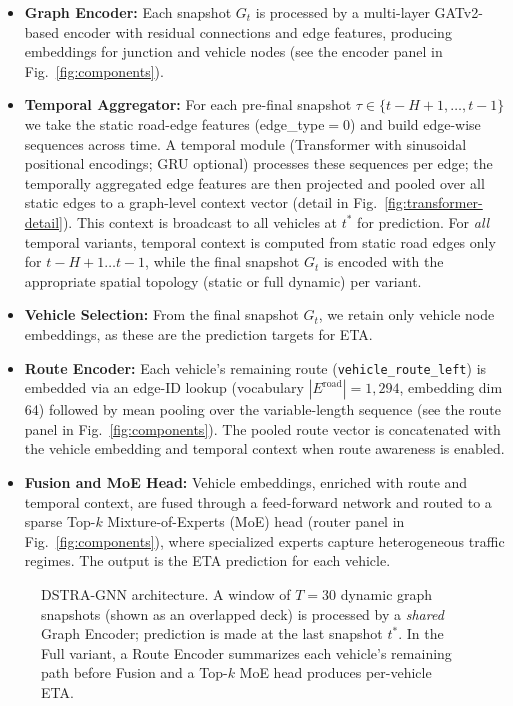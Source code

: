 \begin{itemize}
    \item \textbf{Graph Encoder:} Each snapshot $G_t$ is processed by a multi-layer GATv2-based encoder with residual connections and edge features, producing embeddings for junction and vehicle nodes (see the encoder panel in Fig.~\ref{fig:components}).
    \item \textbf{Temporal Aggregator:} For each pre-final snapshot $\tau\in\{t{-}H{+}1,\ldots,t{-}1\}$ we take the static road-edge features (edge\_type$=0$) and build edge-wise sequences across time. A temporal module (Transformer with sinusoidal positional encodings; GRU optional) processes these sequences per edge; the temporally aggregated edge features are then projected and pooled over all static edges to a graph-level context vector (detail in Fig.~\ref{fig:transformer-detail}). This context is broadcast to all vehicles at $t^*$ for prediction. For \emph{all} temporal variants, temporal context is computed from static road edges only for $t{-}H{+}1\ldots t{-}1$, while the final snapshot $G_t$ is encoded with the appropriate spatial topology (static or full dynamic) per variant.
    \item \textbf{Vehicle Selection:} From the final snapshot $G_t$, we retain only vehicle node embeddings, as these are the prediction targets for ETA.
    \item \textbf{Route Encoder:} Each vehicle’s remaining route (\texttt{vehicle\_route\_left}) is embedded via an edge-ID lookup (vocabulary $|E^{\mathrm{road}}|{=}1{,}294$, embedding dim 64) followed by mean pooling over the variable-length sequence (see the route panel in Fig.~\ref{fig:components}). The pooled route vector is concatenated with the vehicle embedding and temporal context when route awareness is enabled.
    \item \textbf{Fusion and MoE Head:} Vehicle embeddings, enriched with route and temporal context, are fused through a feed-forward network and routed to a sparse Top-$k$ Mixture-of-Experts (MoE) head (router panel in Fig.~\ref{fig:components}), where specialized experts capture heterogeneous traffic regimes. The output is the ETA prediction for each vehicle.
\end{itemize}

\begin{figure}[t]
    \centering
    \resizebox{0.80\textwidth}{!}{}
    \caption{DSTRA-GNN architecture. A window of $T{=}30$ dynamic graph snapshots (shown as an overlapped deck) is processed by a \emph{shared} Graph Encoder; prediction is made at the last snapshot $t^*$. In the Full variant, a Route Encoder summarizes each vehicle's remaining path before Fusion and a Top-$k$ MoE head produces per-vehicle ETA.}
    \label{fig:temporal-moe-eta}
\end{figure}

